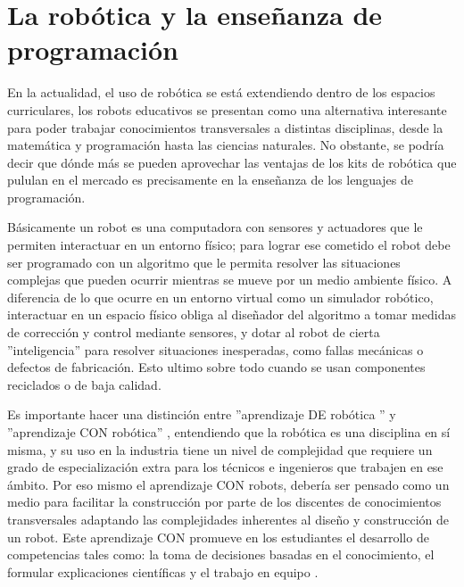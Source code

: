\section{La robótica y la enseñanza de programación}

En la actualidad, el uso de robótica se está extendiendo dentro de los espacios curriculares, los robots educativos se presentan como una alternativa interesante para poder trabajar conocimientos transversales a distintas disciplinas, desde la matemática y programación hasta las ciencias naturales. No obstante, se podría decir que dónde más se pueden aprovechar las ventajas de los kits de robótica que pululan en el mercado es precisamente en la enseñanza de los lenguajes de programación.

Básicamente un robot es una computadora con sensores y actuadores que le permiten interactuar en un entorno físico; para lograr ese cometido el robot debe ser programado con un algoritmo que le permita resolver las situaciones complejas que pueden ocurrir mientras se mueve por un medio ambiente físico. A diferencia de lo que ocurre en un entorno virtual como un simulador robótico, interactuar en un espacio físico obliga al diseñador del algoritmo a tomar medidas de corrección y control mediante sensores, y dotar al robot de cierta ''inteligencia'' para resolver situaciones inesperadas, como fallas mecánicas o defectos de fabricación. Esto ultimo sobre todo cuando se usan componentes reciclados o de baja calidad.

Es importante hacer una distinción entre ''aprendizaje DE robótica '' y ''aprendizaje CON robótica'' \citep{malec2001some}, entendiendo que la robótica es una disciplina en sí misma, y su uso en la industria tiene un nivel de complejidad que requiere un grado de especialización extra para los técnicos e ingenieros que trabajen en ese ámbito. Por eso mismo el aprendizaje CON robots, debería ser pensado como un medio para facilitar la construcción por parte de los discentes de conocimientos transversales adaptando las complejidades inherentes al diseño y construcción de un robot. Este aprendizaje CON  promueve en los estudiantes el desarrollo de competencias tales como: la toma de decisiones basadas en
el conocimiento, el formular explicaciones científicas y el trabajo en equipo \citep{lopez2013aprendizaje}.
